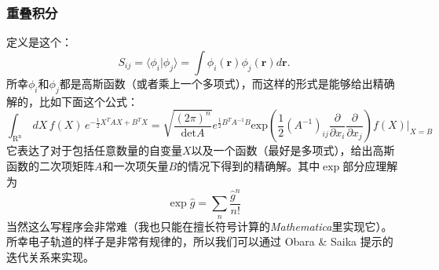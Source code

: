 \documentclass[12pt,a4paper,openany,twoside]{article}
\numberwithin{equation}{section}
\begin{document}
                \subsubsection{重叠积分}
                定义是这个：
                \begin{equation}
                    S_{ij} = \langle \phi_i | \phi_j \rangle = \int \phi_i(\boldsymbol{r}) \phi_j(\boldsymbol{r}) d \boldsymbol{r}.
                \end{equation}
                所幸$\phi_i$和$\phi_j$都是高斯函数（或者乘上一个多项式），而这样的形式是能够给出精确解的，比如下面这个公式：
                \begin{equation}
                    \int_\mathrm{R^n}\, dX \, f(X)\,e^{-\frac{1}{2}X^T A X + B^T X }= \sqrt{\frac{(2\pi)^n}{\mathrm{det} A}}e^{\frac{1}{2}B^T A^{-1}B} \mathrm{exp}\left(\frac{1}{2}(A^{-1})_{ij} \frac{\partial}{\partial x_i}\frac{\partial}{\partial x_j}\right) f(X) \bigg|_{X=B}
                \end{equation}
                它表达了对于包括任意数量的自变量$X$以及一个函数（最好是多项式），给出高斯函数的二次项矩阵$A$和一次项矢量$B$的情况下得到的精确解。其中$\exp$部分应理解为
                \begin{equation}
                    \exp{\hat{g}} = \sum_n \frac{\hat{g}^n}{n!}
                \end{equation}
                当然这么写程序会非常难（我也只能在擅长符号计算的\emph{Mathematica}里实现它）。所幸电子轨道的样子是非常有规律的，所以我们可以通过 Obara \& Saika 提示的迭代关系来实现。
\end{document}

